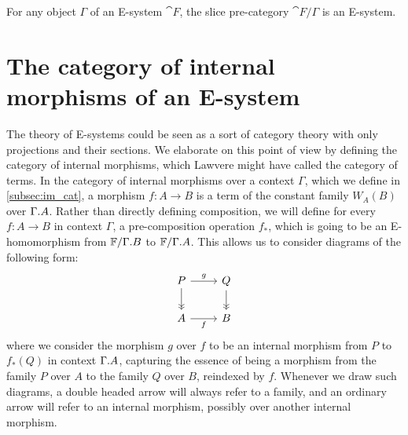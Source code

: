 \begin{cor}
For any object $\Gamma$ of an E-system $\cat{F}$, the slice pre-category $\cat{F}/\Gamma$
is an E-system.
\end{cor}

\begin{comment}
\begin{rmk}[Needs more precision]
Consider the category $E$ generated by the graph consisting of the objects of 
the underlying category of an $E$-system $\mathcal{E}$ as edges, and the morphisms
$S_t:X\to Y$ and $W_A:Y\to X$ as edges, subject to the axioms of an $E$-systems.
 
Any morphism of $E$ can be rewritten in a unique way
as a composition $\tilde S\circ \tilde W$, where $\tilde S$ is a morphism in
substitution-normal form, $\tilde W$ is in weakening normal form, every term
expression is in normal form, and where
each occurence of $S_x\circ W_A$ and $S_{\tfid{A}}\circ W_A/A$ is eliminated.
\end{rmk}
\end{comment}

\section{The category of internal morphisms of an E-system}\label{sec:esys_props}

The theory of E-systems could be seen as a sort of category theory with only
projections and their sections. We elaborate on this point of view by defining
the category of internal morphisms, which Lawvere might have called the
category of terms. 
In the category of internal morphisms over a context $\Gamma$,
which we define in \autoref{subsec:im_cat},
a morphism $f:A\to B$ is a term of the constant family $W_A(B)$ over 
$\ctxext{\Gamma}{A}$. Rather than directly defining composition, we will define
for every $f:A\to B$ in context $\Gamma$, a pre-composition operation
$f_\ast$, which is going to be an E-homomorphism from 
$\cat{F}/\ctxext{\Gamma}{B}$ to $\cat{F}/\ctxext{\Gamma}{A}$. This allows us
to consider diagrams of the following form:
\begin{equation*}
\begin{tikzcd}
P \arrow[d,->>] \arrow[r,"g"] & Q \arrow[d,->>] \\
A \arrow[r,swap,"f"] & B
\end{tikzcd}
\end{equation*}
where we consider the morphism $g$ over $f$ to be an internal morphism from 
$P$ to $f_\ast(Q)$ in context $\ctxext{\Gamma}{A}$, capturing the
essence of being a morphism from the family $P$ over $A$ to the family
$Q$ over $B$, reindexed by $f$. 
Whenever we draw such diagrams, a double headed arrow will always
refer to a family, and an ordinary arrow will refer to an internal morphism,
possibly over another internal morphism.

